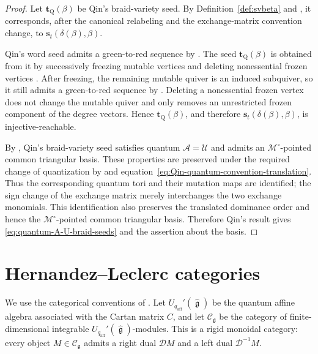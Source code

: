 \documentclass[12pt, reqno]{amsart}
\theoremstyle{plain}
\theoremstyle{definition}
\numberwithin{equation}{section}
\newcommand{\qaff}{q_{\mathrm{aff}}}
\newcommand{\fg}{\operatorname{\mathfrak{g}}}
\begin{document}
\begin{proof}
Let \(\mathbf t_{\mathrm Q}(\beta)\) be Qin's braid-variety seed.
By Definition~\ref{def:svbeta} and
\cite[Lemma~7.2]{qin2024analogs}, it corresponds, after the
canonical relabeling and the exchange-matrix convention change, to
\(\mathbf s_t(\delta(\beta),\beta)\).

Qin's word seed admits a green-to-red sequence by
\cite[Proposition~8.7]{qin2024analogs}. The seed
\(\mathbf t_{\mathrm Q}(\beta)\) is obtained from it by successively
freezing mutable vertices and deleting nonessential frozen vertices
\cite[Lemma~7.2]{qin2024analogs}. After freezing, the remaining
mutable quiver is an induced subquiver, so it still admits a
green-to-red sequence by
\cite[Theorem~3.1.3]{muller2016existence}. Deleting a nonessential
frozen vertex does not change the mutable quiver and only removes an
unrestricted frozen component of the degree vectors. Hence
\(\mathbf t_{\mathrm Q}(\beta)\), and therefore
\(\mathbf s_t(\delta(\beta),\beta)\), is injective-reachable.

By \cite[Theorem~7.3]{qin2024analogs}, Qin's braid-variety seed
satisfies quantum \(\mathcal A=\mathcal U\) and admits an
\(\mathcal M^\circ\)-pointed common triangular basis. These
properties are preserved under the required change of quantization
by \cite[Corollary~4.12 and Proposition~4.18]{qin2024analogs} and equation~\eqref{eq:Qin-quantum-convention-translation}.
Thus the corresponding quantum tori and their mutation maps are
identified; the sign change of the exchange matrix merely
interchanges the two exchange monomials. This identification also
preserves the translated dominance order and hence the
\(\mathcal M^\circ\)-pointed common triangular basis. Therefore
Qin's result gives \eqref{eq:quantum-A-U-braid-seeds} and the
assertion about the basis.
\end{proof}

\section{Hernandez--Leclerc categories}\label{sec:Hernandez}

We use the categorical conventions of \cite{kashiwara2024monoidal}.
Let \(U_{\qaff}'(\widehat{\fg})\) be the quantum affine algebra associated with
the Cartan matrix \(C\), and let \(\mathscr C_{\fg}\) be the category of
finite-dimensional integrable \(U_{\qaff}'(\widehat{\fg})\)-modules. This is a
rigid monoidal category: every object \(M\in\mathscr C_{\fg}\) admits a
right dual \(\mathcal D M\) and a left dual \(\mathcal D^{-1}M\).
\end{document}
